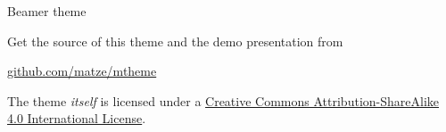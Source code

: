 \documentclass[10pt, compress]{beamer}
\begin{document}




\begin{frame}{Beamer theme}

  Get the source of this theme and the demo presentation from

  \begin{center}\url{github.com/matze/mtheme}\end{center}

  The theme \emph{itself} is licensed under a
  \href{http://creativecommons.org/licenses/by-sa/4.0/}{Creative Commons
  Attribution-ShareAlike 4.0 International License}.

  \begin{center}\ccbysa\end{center}

\end{frame}

\end{document}
